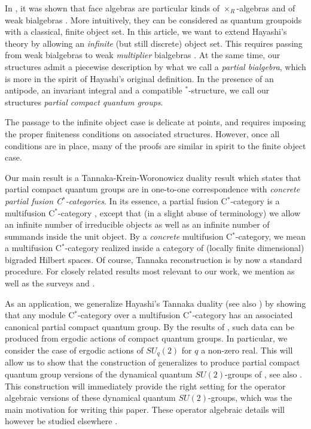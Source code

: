 \documentclass[10pt]{article}
\theoremstyle{definition}
\numberwithin{equation}{section}
\begin{document}
In \cite{Nil1,Sch1,Sch2}, it was shown that face algebras are particular kinds of $\times_R$-algebras \cite{Tak2} and of weak bialgebras \cite{Boh3}. More intuitively, they can be considered as quantum groupoids with a classical, finite object set. In this article, we want to extend Hayashi's theory by allowing an \emph{infinite} (but still discrete) object set. This requires passing from weak bialgebras to weak \emph{multiplier} bialgebras \cite{Boh1}. At the same time, our structures admit a piecewise description by what we call a \emph{partial bialgebra}, which is more in the spirit of Hayashi's original definition. In the presence of an antipode, an invariant integral and a compatible $^*$-structure, we call our structures \emph{partial compact quantum groups}. 

The passage to the infinite object case is delicate at points, and requires imposing the proper finiteness conditions on associated structures. However, once all conditions are in place, many of the proofs are similar in spirit to the finite object case. %

Our main result is a Tannaka-Krein-Woronowicz duality result which states that partial compact quantum groups are in one-to-one correspondence with \emph{concrete partial fusion C$^*$-categories}. In its essence, a partial fusion C$^*$-category is a multifusion C$^*$-category \cite{ENO1}, except that (in a slight abuse of terminology) we allow an infinite number of irreducible objects as well as an infinite number of summands inside the unit object. By a \emph{concrete} multifusion C$^*$-category, we mean a multifusion C$^*$-category realized inside a category of (locally finite dimensional) bigraded Hilbert spaces. Of course, Tannaka reconstruction is by now a standard procedure. %
For closely related results most relevant to our work, we mention \cite{Wor2,Sch3,Hay8,Ost1,Hai1,Szl1,Pfe1,DCY1,Nes1} as well as the surveys \cite{JoS1} and \cite[Section 2.3]{NeT1}.

As an application, we generalize Hayashi's Tannaka duality \cite{Hay8} (see also \cite{Ost1}) by showing that any module C$^*$-category over a multifusion C$^*$-category has an associated canonical partial compact quantum group. By the results of \cite{DCY1}, such data can be produced from ergodic actions of compact quantum groups. In particular,  we consider the case of ergodic actions of $SU_q(2)$ for $q$ a non-zero real. This will allow us to show that the construction of \cite{Hay4} generalizes to produce partial compact quantum group versions of the dynamical quantum $SU(2)$-groups of \cite{EtV1,KoR1}, see also \cite{Sto1}. This construction will immediately provide the right setting for the operator algebraic versions of these dynamical quantum $SU(2)$-groups, which was the main motivation for writing this paper. These operator algebraic details will however be studied elsewhere \cite{DCT2}.
\end{document}
